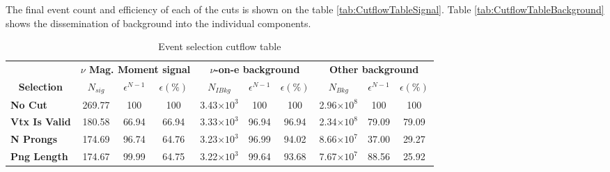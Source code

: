 \iffalse
{}
The final event count and efficiency of each of the cuts is shown on the table \ref{tab:CutflowTableSignal}. Table \ref{tab:CutflowTableBackground} shows the dissemination of background into the individual components.

\begin{table}[!hb]
\caption{Event selection cutflow table}
\begin{tabular}{|l|ccc|ccc|ccc|}\hline
\multicolumn{1}{|c|}{}                                     & \multicolumn{3}{c|}{\textbf{$\nu$ Mag. Moment signal}}          & \multicolumn{3}{c|}{\textbf{$\nu$-on-e background}}                      & \multicolumn{3}{c|}{\textbf{Other background}}                           \\
\multicolumn{1}{|c|}{\multirow{-2}{*}{\textbf{Selection}}} & \multicolumn{1}{c}{\textbf{$N_{sig}$}} & \textbf{$\epsilon^{N-1}$} & \textbf{$\epsilon \left(\%\right)$} & \multicolumn{1}{c}{\textbf{$N_{IBkg}$}} & \textbf{$\epsilon^{N-1}$} & \textbf{$\epsilon \left(\%\right)$} & \multicolumn{1}{c}{\textbf{$N_{Bkg}$}} & \textbf{$\epsilon^{N-1}$} & \textbf{$\epsilon \left(\%\right)$} \\\hline
\textbf{No Cut}      & 269.77            & 100 & 100 & 3.43$\times 10^3$           & 100 & 100                                     & 2.96$\times 10^8$          & 100                                                             & 100                                    \\
\textbf{Vtx Is Valid}  & 180.58            & 66.94                                                              & 66.94                                     & 3.33$\times 10^3$               & 96.94                                                               & 96.94                                      & 2.34$\times 10^8$          & 79.09                                                              & 79.09                                     \\
\textbf{N Prongs}        & 174.69            & 96.74                                                              & 64.76                                     & 3.23$\times 10^3$                             & 96.99                                                               & 94.02                                      & 8.66$\times 10^7$                     & 37.00                                                                 & 29.27                                     \\
\textbf{Png Length}  & 174.67            & 99.99                                                              & 64.75                                     & 3.22$\times 10^3$                                          & 99.64                                                               & 93.68                                      & 7.67$\times 10^7$                              & 88.56                                                              & 25.92                                     \\

\end{tabular}
\end{table}
